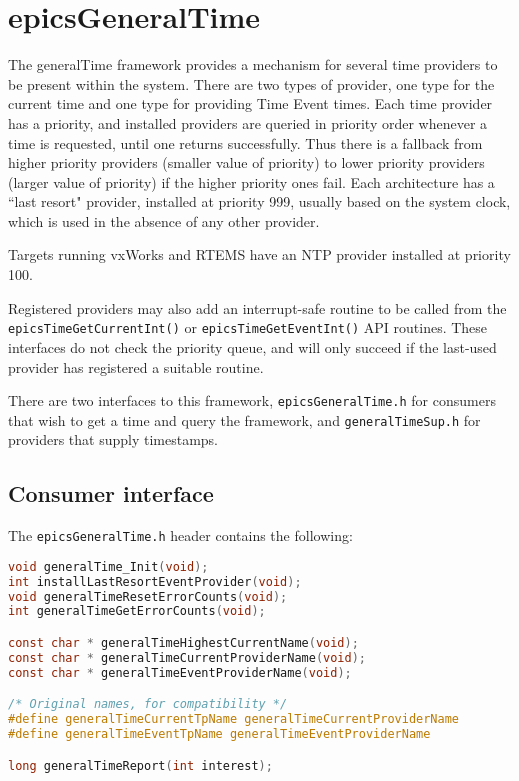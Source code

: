 \section{epicsGeneralTime}

The generalTime framework provides a mechanism for several time providers to be present within the system.
There are two types of provider, one type for the current time and one type for providing Time Event times.
Each time provider has a priority, and installed providers are queried in priority order whenever a time is requested, until one returns successfully.
Thus there is a fallback from higher priority providers (smaller value of priority) to lower priority providers (larger value 
of priority) if the higher priority ones fail.
Each architecture has a ``last resort" provider, installed at priority 999, usually based on the system clock, which is used in the absence of any other provider.

Targets running vxWorks and RTEMS have an NTP provider installed at priority 100.

Registered providers may also add an interrupt-safe routine to be called from the \verb|epicsTimeGetCurrentInt()| or \verb|epicsTimeGetEventInt()| API routines.
These interfaces do not check the priority queue, and will only succeed if the last-used provider has registered a suitable routine.

There are two interfaces to this framework, \verb|epicsGeneralTime.h| for consumers that wish to get a time and query the 
framework, and \verb|generalTimeSup.h| for providers that supply timestamps.

\subsection{Consumer interface}

The \verb|epicsGeneralTime.h| header contains the following:

\begin{lstlisting}[language=C]
void generalTime_Init(void);
int installLastResortEventProvider(void);
void generalTimeResetErrorCounts(void);
int generalTimeGetErrorCounts(void);

const char * generalTimeHighestCurrentName(void);
const char * generalTimeCurrentProviderName(void);
const char * generalTimeEventProviderName(void);

/* Original names, for compatibility */
#define generalTimeCurrentTpName generalTimeCurrentProviderName
#define generalTimeEventTpName generalTimeEventProviderName

long generalTimeReport(int interest);
\end{lstlisting}

